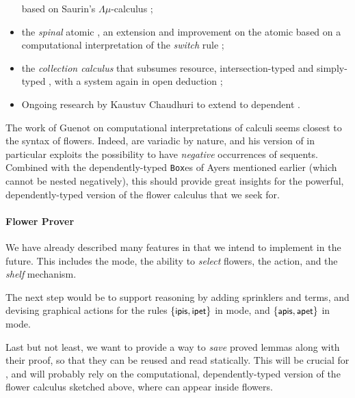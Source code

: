 \begin{scope}
\begin{itemize}
   based on Saurin's $\Lambda\mu$-calculus
  ;
  \item the \emph{spinal} atomic , an extension and
  improvement on the atomic  based on a computational
  interpretation of the \emph{switch} rule ;
  \item the \emph{collection calculus} that subsumes resource,
  intersection-typed and simply-typed , with a  system
  again in open deduction ;
  \item Ongoing research by Kaustuv Chaudhuri to extend  to
  dependent .
\end{itemize}
The work of Guenot on computational interpretations of  calculi
seems closest to the syntax of flowers. Indeed,  are variadic by
nature, and his version of  in particular exploits the
possibility to have \emph{negative} occurrences of sequents. Combined with the
dependently-typed \texttt{Box}es of Ayers mentioned earlier (which cannot be
nested negatively), this should provide great insights for the powerful,
dependently-typed version of the flower calculus that we seek for.

\paragraph{Flower Prover}

We have already described many features in  that we
intend to implement in the future. This includes the \Navigation mode, the
ability to \emph{select} flowers, the  \Proof action, and the
\emph{shelf} mechanism.

The next step would be to support  reasoning by adding sprinklers and
 terms, and devising graphical actions for the rules $\{\text{\small$\mathsf{ipis}$},
\text{\small$\mathsf{ipet}$}\}$ in \Proof mode, and $\{\text{\small$\mathsf{apis}$}, \text{\small$\mathsf{apet}$}\}$ in \Edit mode.

Last but not least, we want to provide a way to \emph{save} proved lemmas along
with their proof, so that they can be reused and read statically. This will be
crucial for \emph{}, and will probably rely on the computational,
dependently-typed version of the flower calculus sketched above, where  can appear inside flowers.


\end{scope}
